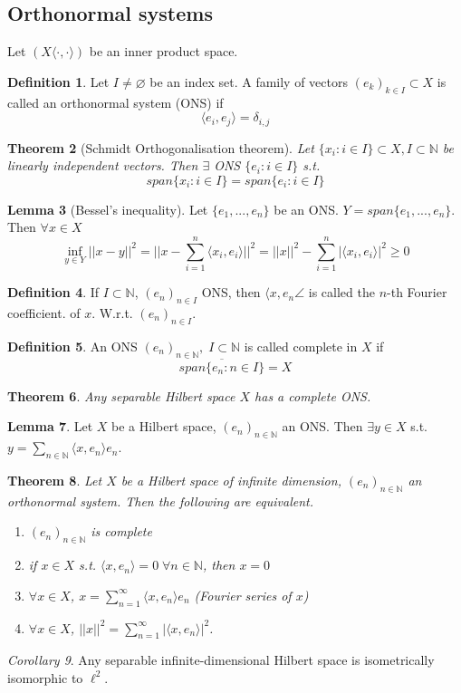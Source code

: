\documentclass[a4paper, 12pt]{article}
\theoremstyle{plain}
\newtheorem{theorem}{Theorem}[subsection] %
\theoremstyle{definition}
\newtheorem{definition}[theorem]{Definition} %
\theoremstyle{lemma}
\newtheorem{lemma}[theorem]{Lemma}
\theoremstyle{remark}
\theoremstyle{corollary}
\newtheorem{corollary}[theorem]{Corollary}
\theoremstyle{example}
\begin{document}
	\subsection{Orthonormal systems}
	Let $(X\langle\cdot , \cdot \rangle)$ be an inner product space. 
	\begin{definition}
		Let $I \neq \varnothing$ be an index set. A family of vectors $(e_k)_{k\in I} \subset X$ is called an orthonormal system (ONS) if \[\langle e_i,e_j\rangle = \delta_{i,j}\] 
	\end{definition}
	\begin{theorem}[Schmidt Orthogonalisation theorem]
		Let $\{x_i: i \in I\} \subset X, I \subset \mathbb{N}$ be linearly independent vectors. Then $\exists$ ONS $\{e_i: i \in I\}$ s.t. \[span\{x_i: i \in I\} = span\{e_i: i \in I\}\]
	\end{theorem}
	\begin{lemma}[Bessel's inequality]
		Let $\{e_1,...,e_n\}$ be an ONS. $Y = span\{e_1,...,e_n\}$. Then $\forall x \in X$ \[\inf_{y \in Y} ||x-y||^2 = ||x-\sum_{i=1}^n \langle x_i,e_i\rangle||^2 = ||x||^2 - \sum_{i=1}^n \left|\langle x_i, e_i\rangle\right|^2 \geq 0\]
	\end{lemma}
	\begin{definition}
		If $I\subset \mathbb{N}$, $(e_n)_{n\in I}$ ONS, then $\langle x, e_n \angle$ is called the $n$-th Fourier coefficient. of $x$. W.r.t. $(e_n)_{n \in I}$.
	\end{definition}
	\begin{definition}
		An ONS $(e_n)_{n\in \mathbb{N}}, \; I \subset \mathbb{N}$ is called complete in $X$ if \[\overline{span\{e_n: n \in I\}} = X\]
	\end{definition}
	\begin{theorem}
		Any separable Hilbert space $X$ has a complete ONS.
	\end{theorem}
	\begin{lemma}
		Let $X$ be a Hilbert space, $(e_n)_{n \in \mathbb{N}}$ an ONS. Then $\exists y \in X$ s.t. $y = \sum_{n \in \mathbb{N}} \langle x, e_n\rangle e_n$. 
	\end{lemma}
	\begin{theorem}
		Let $X$ be a Hilbert space of infinite dimension, $(e_n)_{n\in \mathbb{N}}$ an orthonormal system. Then the following are equivalent. 
		\begin{enumerate}
			\item $(e_n)_{n\in \mathbb{N}}$ is complete
			\item if $x \in X$ s.t. $\langle x, e_n \rangle = 0 \; \forall n \in \mathbb{N}$, then $x=0$
			\item $\forall x \in X$, $x = \sum_{n=1}^\infty \langle x,e_n\rangle e_n$ (Fourier series of $x$)
			\item $\forall x \in X$, $||x||^2 = \sum_{n=1}^\infty \left|\langle x,e_n\rangle\right|^2$. 
		\end{enumerate}
	\end{theorem}
	\begin{corollary}
		Any separable infinite-dimensional Hilbert space is isometrically isomorphic to $\ell^2$.
	\end{corollary}
\end{document}
